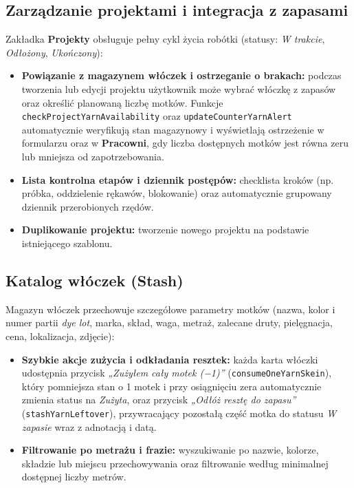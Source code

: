 \documentclass[11pt, a4paper]{article}
\begin{document}
\subsection{Zarządzanie projektami i integracja z zapasami}
Zakładka \textbf{Projekty} obsługuje pełny cykl życia robótki (statusy: \textit{W trakcie}, \textit{Odłożony}, \textit{Ukończony}):
\begin{itemize}
  \item \textbf{Powiązanie z magazynem włóczek i ostrzeganie o brakach:} podczas tworzenia lub edycji projektu użytkownik może wybrać włóczkę z zapasów oraz określić planowaną liczbę motków. Funkcje \texttt{checkProjectYarnAvailability} oraz \texttt{updateCounterYarnAlert} automatycznie weryfikują stan magazynowy i wyświetlają ostrzeżenie w formularzu oraz w \textbf{Pracowni}, gdy liczba dostępnych motków jest równa zeru lub mniejsza od zapotrzebowania.
  \item \textbf{Lista kontrolna etapów i dziennik postępów:} checklista kroków (np. próbka, oddzielenie rękawów, blokowanie) oraz automatycznie grupowany dziennik przerobionych rzędów.
  \item \textbf{Duplikowanie projektu:} tworzenie nowego projektu na podstawie istniejącego szablonu.
\end{itemize}

\subsection{Katalog włóczek (Stash)}
Magazyn włóczek przechowuje szczegółowe parametry motków (nazwa, kolor i numer partii \textit{dye lot}, marka, skład, waga, metraż, zalecane druty, pielęgnacja, cena, lokalizacja, zdjęcie):
\begin{itemize}
  \item \textbf{Szybkie akcje zużycia i odkładania resztek:} każda karta włóczki udostępnia przycisk \textit{„Zużyłem cały motek (−1)”} (\texttt{consumeOneYarnSkein}), który pomniejsza stan o 1 motek i przy osiągnięciu zera automatycznie zmienia status na \textit{Zużyta}, oraz przycisk \textit{„Odłóż resztę do zapasu”} (\texttt{stashYarnLeftover}), przywracający pozostałą część motka do statusu \textit{W zapasie} wraz z adnotacją i datą.
  \item \textbf{Filtrowanie po metrażu i frazie:} wyszukiwanie po nazwie, kolorze, składzie lub miejscu przechowywania oraz filtrowanie według minimalnej dostępnej liczby metrów.
\end{itemize}
\end{document}
